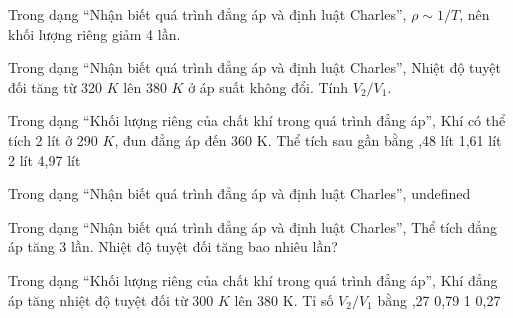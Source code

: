 \begin{bt}
Trong dạng “Nhận biết quá trình đẳng áp và định luật Charles”, $\rho\sim1/T$, nên khối lượng riêng giảm 4 lần.
\end{bt}

\begin{ex}
Trong dạng “Nhận biết quá trình đẳng áp và định luật Charles”, Nhiệt độ tuyệt đối tăng từ 320 $K$ lên 380 $K$ ở áp suất không đổi. Tính $V_2/V_1$.
\end{ex}

\begin{ex}
Trong dạng “Khối lượng riêng của chất khí trong quá trình đẳng áp”, Khí có thể tích 2 lít ở 290 $K$, đun đẳng áp đến 360 K. Thể tích sau gần bằng
\choice
{,48 lít}
{1,61 lít}
{2 lít}
{4,97 lít}
\end{ex}

\begin{bt}
Trong dạng “Nhận biết quá trình đẳng áp và định luật Charles”, undefined
\end{bt}

\begin{ex}
Trong dạng “Nhận biết quá trình đẳng áp và định luật Charles”, Thể tích đẳng áp tăng 3 lần. Nhiệt độ tuyệt đối tăng bao nhiêu lần?
\end{ex}

\begin{ex}
Trong dạng “Khối lượng riêng của chất khí trong quá trình đẳng áp”, Khí đẳng áp tăng nhiệt độ tuyệt đối từ 300 $K$ lên 380 K. Tỉ số $V_2/V_1$ bằng
\choice
{,27}
{0,79}
{1}
{0,27}
\end{ex}

